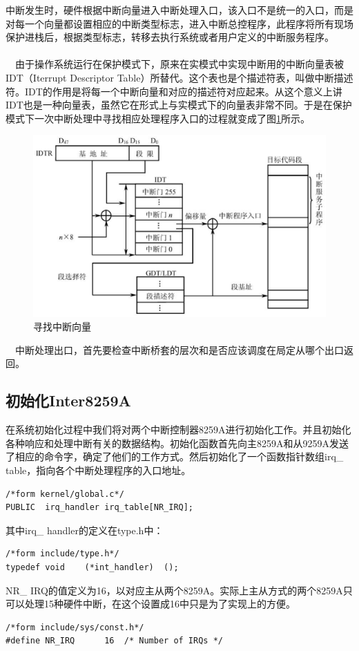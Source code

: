 \documentclass[UTF8,nofonts,cs4size]{ctexrep}
\begin{document}
\indent 中断发生时，硬件根据中断向量进入中断处理入口，该入口不是统一的入口，而是对每一个向量都设置相应的中断类型标志，进入中断总控程序，此程序将所有现场保护进栈后，根据类型标志，转移去执行系统或者用户定义的中断服务程序。
\paragraph{}
\indent \ \ 由于操作系统运行在保护模式下，原来在实模式中实现中断用的中断向量表被IDT（Iterrupt Descriptor Table）所替代。这个表也是个描述符表，叫做中断描述符。IDT的作用是将每一个中断向量和对应的描述符对应起来。从这个意义上讲IDT也是一种向量表，虽然它在形式上与实模式下的向量表非常不同。于是在保护模式下一次中断处理中寻找相应处理程序入口的过程就变成了图\ref{interruptslove}所示。
\begin{figure}[htp]
\centering
\includegraphics[scale=0.4]{interruptslove.eps}
\caption{寻找中断向量}
\label{interruptslove}
\end{figure}
\indent \ \ 
中断处理出口，首先要检查中断桥套的层次和是否应该调度在局定从哪个出口返回。
\subsection{初始化Inter8259A}
在系统初始化过程中我们将对两个中断控制器8259A进行初始化工作。并且初始化各种响应和处理中断有关的数据结构。初始化函数首先向主8259A和从9259A发送了相应的命令字，确定了他们的工作方式。然后初始化了一个函数指针数组irq\_ table，指向各个中断处理程序的入口地址。
\begin{lstlisting}
/*form kernel/global.c*/
PUBLIC	irq_handler	irq_table[NR_IRQ];
\end{lstlisting}
其中irq\_ handler的定义在type.h中：
\begin{lstlisting}
/*form include/type.h*/
typedef	void	(*int_handler)	();
\end{lstlisting}
NR\_ IRQ的值定义为16，以对应主从两个8259A。实际上主从方式的两个8259A只可以处理15种硬件中断，在这个设置成16中只是为了实现上的方便。
\begin{lstlisting}
/*form include/sys/const.h*/
#define	NR_IRQ		16	/* Number of IRQs */
\end{lstlisting}
\end{document}
